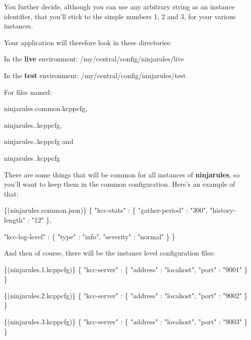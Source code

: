 You further decide, although you can use any arbitrary string as an instance identifier, that you'll stick to the simple numbers 1, 2 and 3, for your various instances.

Your application will therefore look in these directories\-:
\begin{DoxyItemize}
\item In the {\bfseries live} environment\-: /my/central/config/ninjarules/live
\item In the {\bfseries test} environment\-: /my/central/config/ninjarules/test
\end{DoxyItemize}

For files named\-:
\begin{DoxyItemize}
\item ninjarules.\-common.\-kcppcfg,
\item ninjarules..\-kcppcfg,
\item ninjarules..\-kcppcfg and
\item ninjarules..\-kcppcfg
\end{DoxyItemize}

There are some things that will be common for all instances of {\bfseries ninjarules}, so you'll want to keep them in the common configuration. Here's an example of that\-: 
\begin{DoxyCode}
\{(ninjarules.common.json)\}
\{
  \textcolor{stringliteral}{"kcc-stats"}     : \{
    \textcolor{stringliteral}{"gather-period"}  : \textcolor{stringliteral}{"300"},
    \textcolor{stringliteral}{"history-length"} : \textcolor{stringliteral}{"12"}
  \},

  \textcolor{stringliteral}{"kcc-log-level"} : \{
    \textcolor{stringliteral}{"type"}           : \textcolor{stringliteral}{"info"},
    \textcolor{stringliteral}{"severity"}       : \textcolor{stringliteral}{"normal"}
  \}
\}
\end{DoxyCode}


And then of course, there will be the instance level configuration files\-: 
\begin{DoxyCode}
\{(ninjarules.1.kcppcfg)\}
\{
  \textcolor{stringliteral}{"kcc-server"}    : \{
    \textcolor{stringliteral}{"address"}        : \textcolor{stringliteral}{"locahost"},
    \textcolor{stringliteral}{"port"}           : \textcolor{stringliteral}{"9001"}
  \}
\}
\end{DoxyCode}
 
\begin{DoxyCode}
\{(ninjarules.2.kcppcfg)\}
\{
  \textcolor{stringliteral}{"kcc-server"}    : \{
    \textcolor{stringliteral}{"address"}        : \textcolor{stringliteral}{"locahost"},
    \textcolor{stringliteral}{"port"}           : \textcolor{stringliteral}{"9002"}
  \}
\}
\end{DoxyCode}
 
\begin{DoxyCode}
\{(ninjarules.3.kcppcfg)\}
\{
  \textcolor{stringliteral}{"kcc-server"}    : \{
    \textcolor{stringliteral}{"address"}        : \textcolor{stringliteral}{"locahost"},
    \textcolor{stringliteral}{"port"}           : \textcolor{stringliteral}{"9003"}
  \}
\}
\end{DoxyCode}
 